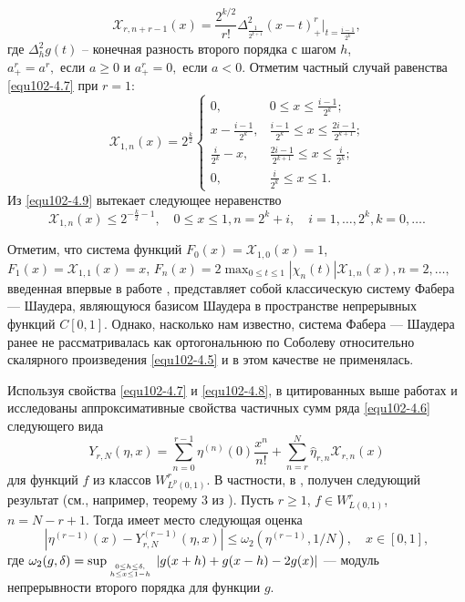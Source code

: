    \begin{equation}\label{equ102-4.8}
 \mathcal{ X}_{r,n+r-1}(x)=\frac{2^{k/2}}{r!}\Delta^2_\frac{1}{2^{k+1}}(x-t)^r_+
 \big|_{t=\frac{i-1}{2^k}},
\end{equation}
где $\Delta^2_h g(t)$ -- конечная разность второго порядка с шагом $h$, $a_+^r=a^r, \text{ если } a\ge0 $ и $a_+^r=0, \text{ если } a<0 $. Отметим частный случай равенства \eqref{equ102-4.7} при $r=1$:
\begin{equation}\label{equ102-4.9}
 \mathcal{ X}_{1,n}(x)=2^{\frac{k}{2}}
 \begin{cases} 0,&\text{$0\le x\le\frac{i-1}{2^k}$;}\\
 x-\frac{i-1}{2^k},&\text{$\frac{i-1}{2^k}\le x\le \frac{2i-1}{2^{k+1}}$;}\\
 \frac{i}{2^{k}}-x,&\text{$\frac{2i-1}{2^{k+1}}\le x\le \frac{i}{2^{k}}$;}\\
  0, &\text{$\frac{i}{2^{k}}\le x\le1$}.
   \end{cases}
  \end{equation} Из \eqref{equ102-4.9} вытекает следующее неравенство
\begin{equation}\label{equ102-4.10}
 \mathcal{ X}_{1,n}(x)\le 2^{-\frac{k}{2}-1}, \quad 0\le x\le 1, n=2^k+i,\quad i=1,\ldots,2^k, k=0,\ldots.
  \end{equation}

Отметим, что система функций $F_0(x)=\mathcal{ X}_{1,0}(x)=1$, $F_1(x)=\mathcal{ X}_{1,1}(x)=x$,
$F_n(x)=2\max_{0\le t\le1}|\chi_{n}(t)|\mathcal{ X}_{1,n}(x), n=2,\ldots,$
введенная впервые  в работе \cite{equ102-Faber}, представляет собой классическую систему Фабера --- Шаудера, являющуюся базисом Шаудера в пространстве непрерывных функций $C[0,1]$.  Однако, насколько нам известно,  система Фабера --- Шаудера ранее не рассматривалась как ортогональнюю по Соболеву относительно скалярного произведения \eqref{equ102-4.5} и в этом качестве не применялась.

Используя свойства \eqref{equ102-4.7} и \eqref{equ102-4.8}, в цитированных выше работах  \cite{equ102-Shar19} и \cite{equ102-Shar20} исследованы аппроксимативные свойства частичных сумм  ряда \eqref{equ102-4.6} следующего вида
\begin{equation}\label{equ102-4.11}
 Y_{r,N}(\eta,x)=\sum_{n=0}^{r-1} \eta^{(n)}(0)\frac{x^n}{n!}+ \sum_{n=r}^{N}\hat \eta_{r,n}\mathcal{ X}_{r,n}(x)
 \end{equation}
 для функций $f$ из  классов  $W^r_{L^p(0,1)}$. В частности, в \cite{equ102-Shar19}, \cite{equ102-Shar20} получен следующий результат (см., например, теорему 3 из \cite{equ102-Shar20}). Пусть $r\ge1$, $f\in W^r_{L(0,1)}$, $n=N-r+1$.  Тогда имеет место следующая оценка
\begin{equation}\label{equ102-4.12}
|\eta^{(r-1)}(x)-Y_{r,N}^{(r-1)}(\eta,x)| \le \omega_2(\eta^{(r-1)},1/N), \quad x\in[0,1],
\end{equation}
где $\omega_2(g,\delta)=\sup_{\atop{ 0\le h\le\delta,\atop h\le x\le 1-h}}|g(x+h)+g(x-h)-2g(x)|$ --- модуль непрерывности второго порядка для функции $g$.


